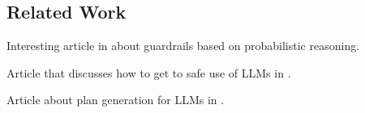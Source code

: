 %

\subsection{Related Work}
Interesting article in \citep{kang2024r} about guardrails based on probabilistic reasoning.

Article that discusses how to get to safe use of LLMs in \citep{wu2024medical}.

Article about plan generation for LLMs in \citep{hsu2025medplan}.